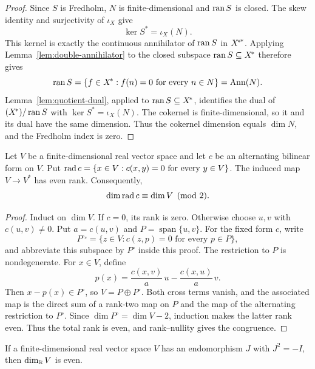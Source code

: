 \begin{proof}
Since $S$ is Fredholm, $N$ is finite-dimensional and $\operatorname{ran} S$ is closed. The skew identity and
surjectivity of $\iota_X$ give
\[
  \ker S^*=\iota_X(N).
\]
This kernel is exactly the continuous annihilator of $\operatorname{ran} S$ in ${{X}^{\!*}}^{\!*}$.
Applying Lemma~\ref{lem:double-annihilator} to the closed subspace
$\operatorname{ran} S\subseteq{X}^{\!*}$ therefore gives
\[
  \operatorname{ran} S=\{f\in{X}^{\!*}:f(n)=0\text{ for every }n\in N\}=\operatorname{Ann}(N).
\]
Lemma~\ref{lem:quotient-dual}, applied to $\operatorname{ran} S\subseteq{X}^{\!*}$, identifies the dual of
$({X}^{\!*})/\operatorname{ran} S$ with $\ker S^*=\iota_X(N)$. The cokernel is finite-dimensional, so it and
its dual have the same dimension. Thus the cokernel dimension equals $\dim N$, and the Fredholm
index is zero.
\end{proof}

\begin{lemma}\label{lem:finite-alt-even}
Let $V$ be a finite-dimensional real vector space and let $c$ be an alternating bilinear form on
$V$. Put $\operatorname{rad} c=\{x\in V:c(x,y)=0\text{ for every }y\in V\}$. The induced map
$V\to V^*$ has even rank. Consequently,
\[
  \dim\operatorname{rad} c\equiv\dim V\pmod2.
\]
\leanok
\end{lemma}

\begin{proof}
Induct on $\dim V$. If $c=0$, its rank is zero. Otherwise choose $u,v$ with $c(u,v)\ne0$.
Put $a=c(u,v)$ and $P=\operatorname{span}\{u,v\}$. For the fixed form $c$, write
\[
  P^{\circ_c}=\{z\in V:c(z,p)=0\text{ for every }p\in P\},
\]
and abbreviate this subspace by $P^\circ$ inside this proof. The restriction to $P$ is
nondegenerate. For $x\in V$, define
\[
  p(x)=\frac{c(x,v)}a\,u-\frac{c(x,u)}a\,v.
\]
Then $x-p(x)\in P^\circ$, so $V=P\oplus P^\circ$. Both cross terms vanish, and the associated
map is the direct sum of a rank-two map on $P$ and the map of the alternating restriction to
$P^\circ$. Since $\dim P^\circ=\dim V-2$, induction makes the latter rank even. Thus the total
rank is even, and rank--nullity gives the congruence.
\end{proof}

\begin{lemma}\label{lem:finite-complex-even}
If a finite-dimensional real vector space $V$ has an endomorphism $J$ with $J^2=-I$, then
$\dim_{\mathbb R} V$ is even.
\leanok
\end{lemma}

